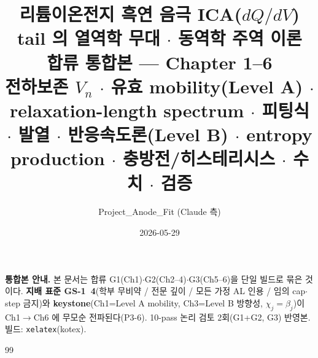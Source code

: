 \documentclass[11pt,a4paper]{article}
\title{\textbf{리튬이온전지 흑연 음극 ICA($dQ/dV$) tail 의 열역학 무대 $\cdot$ 동역학 주역 이론}\\[0.4em]
\large 합류 통합본 — Chapter 1--6\\[0.2em]
\normalsize 전하보존 $V_n$ $\cdot$ 유효 mobility(Level A) $\cdot$ relaxation-length spectrum $\cdot$ 피팅식 $\cdot$
발열 $\cdot$ 반응속도론(Level B) $\cdot$ entropy production $\cdot$ 충방전/히스테리시스 $\cdot$ 수치 $\cdot$ 검증}
\author{Project\_Anode\_Fit (Claude 측)}
\date{2026-05-29}
\begin{document}
\maketitle

\begin{mdframed}
\textbf{통합본 안내.} 본 문서는 합류 G1(Ch1)$\cdot$G2(Ch2--4)$\cdot$G3(Ch5--6)을 단일 빌드로 묶은 것이다.
\textbf{지배 표준 GS-1~4}(학부 무비약 / 전문 깊이 / 모든 가정 AL 인용 / 임의 cap$\cdot$step 금지)와
\textbf{keystone}(Ch1=Level A mobility, Ch3=Level B 방향성, $\chi_j=\beta_j$)이 Ch1$\to$Ch6 에 무모순
전파된다(P3-6). 10-pass 논리 검토 2회(G1+G2, G3) 반영본. 빌드: \texttt{xelatex}(kotex).
\end{mdframed}

\tableofcontents
\newpage

\setcounter{section}{0}
\renewcommand{\thesubsection}{1.\arabic{section}.\arabic{subsection}}

\clearpage


\clearpage


\clearpage

\begin{thebibliography}{99}

\end{thebibliography}
\end{document}
